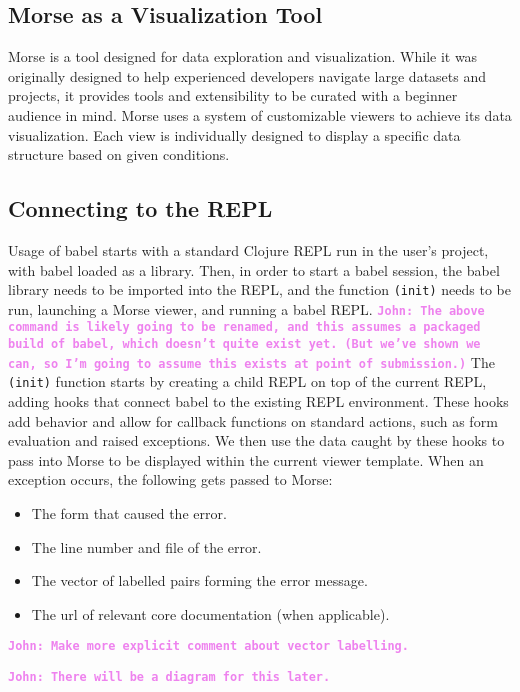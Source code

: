\documentclass[12pt]{article}
\newcommand{\comment}[1]{{\bf \tt  {#1}}}
\newcommand{\jwcomment}[1]{\textcolor{violet}{\comment{John: {#1}}}}
\begin{document}
\subsection{Morse as a Visualization Tool}\label{subsec:Morse}
Morse is a tool designed for data exploration and visualization.
While it was originally designed to help experienced developers navigate large datasets and projects, 
it provides tools and extensibility to be curated with a beginner audience in mind.
Morse uses a system of customizable viewers to achieve its data visualization.
Each view is individually designed to display a specific data structure based on given conditions.

\subsection{Connecting to the REPL}\label{subsec:connect-to-REPL}

Usage of babel starts with a standard Clojure REPL run in the user's project, with babel loaded as a library.
Then, in order to start a babel session, the babel library needs to be imported into the REPL, and the function 
\texttt{(init)} needs to be run, launching a Morse viewer, and running a babel REPL.
\jwcomment{The above command is likely going to be renamed, and this assumes a packaged build of babel, which
doesn't quite exist yet. (But we've shown we can, so I'm going to assume this exists at point of submission.)}
The \texttt{(init)} function starts by creating a child REPL on top of the current REPL, adding hooks that connect babel to 
the existing REPL environment. 
These hooks add behavior and allow for callback functions on standard actions, such as form evaluation and raised exceptions.
We then use the data caught by these hooks to pass into Morse to be displayed within the current viewer template. 
When an exception occurs, the following gets passed to Morse:
\begin{itemize}
	\item{The form that caused the error.}
	\item{The line number and file of the error.}
	\item{The vector of labelled pairs forming the error message.}
	\item{The url of relevant core documentation (when applicable).}
\end{itemize}

\jwcomment{Make more explicit comment about vector labelling.}

\jwcomment{There will be a diagram for this later.}
\end{document}
